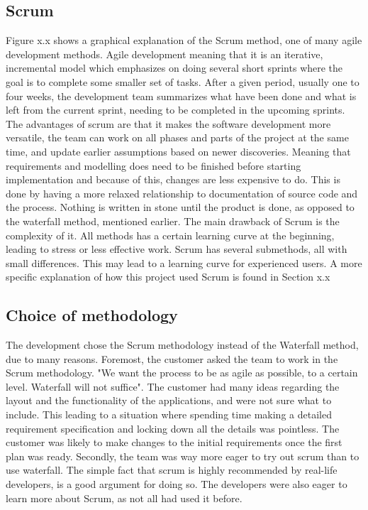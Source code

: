 \subsection{Scrum}
\label{sec:scrum}
Figure x.x shows a graphical explanation of the Scrum method, one of many agile development methods. Agile development meaning that it is an iterative, incremental model which emphasizes on doing several short sprints where the goal is to complete some smaller set of tasks. After a given period, usually one to four weeks, the development team summarizes what have been done and what is left from the current sprint, needing to be completed in the upcoming sprints.
The advantages of scrum are that it makes the software development more versatile, the team can work on all phases and parts of the project at the same time, and update earlier assumptions based on newer discoveries. Meaning that requirements and modelling does need to be finished before starting implementation and because of this, changes are less expensive to do. This is done by having a more relaxed relationship to documentation of source code and the process.
Nothing is written in stone until the product is done, as opposed to the waterfall method, mentioned earlier.
The main drawback of Scrum is the complexity of it. All methods has a certain learning curve at the beginning, leading to stress or less effective work. Scrum has several submethods, all with small differences. This may lead to a learning curve for experienced users.
A more specific explanation of how this project used Scrum is found in Section x.x

\subsection{Choice of methodology}
The development chose the Scrum methodology instead of the Waterfall method, due to many reasons. Foremost, the customer asked the team to work in the Scrum methodology. "We want the process to be as agile as possible, to a certain level. Waterfall will not suffice". The customer had many ideas regarding the layout and the functionality of the applications, and were not sure what to include. This leading to a situation where spending time making a detailed requirement specification and locking down all the details was pointless.
The customer was likely to make changes to the initial requirements once the first plan was ready. Secondly, the team was way more eager to try out scrum than to use waterfall. The simple fact that scrum is highly recommended by real-life developers, is a good argument for doing so. The developers were also eager to learn more about Scrum, as not all had used it before.



